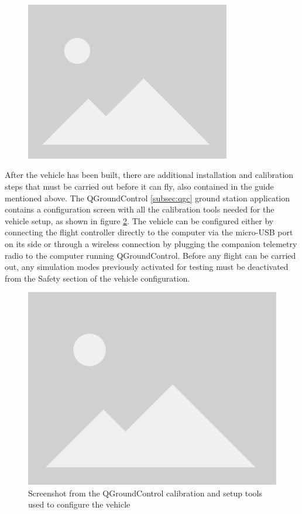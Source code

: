 \begin{figure}
  \centering
  \includegraphics[width=0.8\textwidth, keepaspectratio]{img/placeholder.png}
  \caption{}\label{fig:camera-holder-3d}
\end{figure}


After the vehicle has been built, there are additional installation and calibration steps that must be carried out before it can fly, also contained in the guide mentioned above.
The QGroundControl \ref{subsec:qgc} ground station application contains a configuration screen with all the calibration tools needed for the vehicle setup, as shown in figure \ref{fig:qgc-config}.
The vehicle can be configured either by connecting the flight controller directly to the computer via the micro-USB port on its side or through a wireless connection by plugging the companion telemetry radio to the computer running QGroundControl.
Before any flight can be carried out, any simulation modes previously activated for testing must be deactivated from the Safety section of the vehicle configuration.


\begin{figure}
  \centering
  \includegraphics[width=\textwidth, keepaspectratio]{img/placeholder.png}
  \caption{Screenshot from the QGroundControl calibration and setup tools used to configure the vehicle}\label{fig:qgc-config}
\end{figure}


